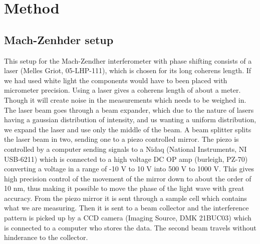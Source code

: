 \section {Method}

\subsection {Mach-Zenhder setup}
This setup for the Mach-Zendher interferometer with phase shifting consists of
a laser (Melles Griot, 05-LHP-111), which is chosen for its long coherens length. 
If we had used white light the components would have to been placed with micrometer 
precision. Using a laser gives a coherens length of about a meter. Though it will 
create noise in the measurements which needs to be weighed in.
The laser beam goes through a beam expander, which due to the nature of lasers having 
a gaussian distribution of intensity, and us wanting a uniform distribution, 
we expand the laser and use only the middle of the beam.
A beam splitter splits the laser beam in two, sending one to a piezo controlled
mirror. 
The piezo is controlled by a computer sending signals to a Nidaq 
(National Instruments, NI USB-6211) which is connected to a high voltage DC OP amp
(burleigh, PZ-70) converting a voltage in a range of -10 V to 10 V 
into 500 V to 1000 V. This gives high precision control of the movement of the 
mirror down to about the order of 10 nm, thus making it possible to move the 
phase of the light wave with great accuracy. From the piezo mirror it is sent 
through a sample cell which contains what we are measuring.
Then it is sent to a beam collector and the interference pattern is picked up by
a CCD camera (Imaging Source, DMK 21BUC03) which is connected to a computer who stores the data.
The second beam travels without hinderance to the collector.

